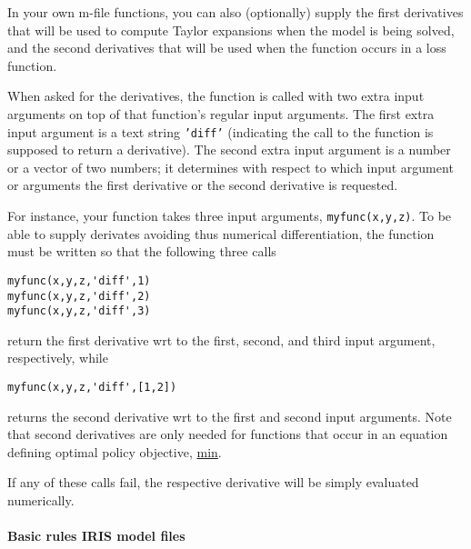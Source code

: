 In your own m-file functions, you can also (optionally) supply the first
derivatives that will be used to compute Taylor expansions when the
model is being solved, and the second derivatives that will be used when
the function occurs in a loss function.

When asked for the derivatives, the function is called with two extra
input arguments on top of that function's regular input arguments. The
first extra input argument is a text string \texttt{'diff'} (indicating
the call to the function is supposed to return a derivative). The second
extra input argument is a number or a vector of two numbers; it
determines with respect to which input argument or arguments the first
derivative or the second derivative is requested.

For instance, your function takes three input arguments,
\texttt{myfunc(x,y,z)}. To be able to supply derivates avoiding thus
numerical differentiation, the function must be written so that the
following three calls

\begin{verbatim}
myfunc(x,y,z,'diff',1)
myfunc(x,y,z,'diff',2)
myfunc(x,y,z,'diff',3)
\end{verbatim}

return the first derivative wrt to the first, second, and third input
argument, respectively, while

\begin{verbatim}
myfunc(x,y,z,'diff',[1,2])
\end{verbatim}

returns the second derivative wrt to the first and second input
arguments. Note that second derivatives are only needed for functions
that occur in an equation defining optimal policy objective,
\href{modellang/min}{min}.

If any of these calls fail, the respective derivative will be simply
evaluated numerically.

\paragraph{Basic rules IRIS model
files}\label{basic-rules-iris-model-files}

